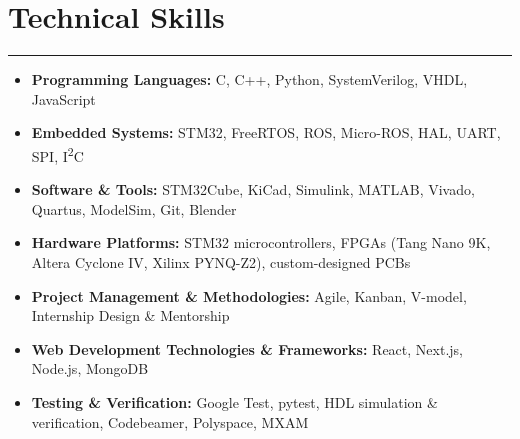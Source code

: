 \section*{Technical Skills}
\vspace{-5pt}
\noindent\rule{\textwidth}{0.4pt}

\begin{itemize}[leftmargin=*,noitemsep,topsep=3pt]
    \item \textbf{Programming Languages:} C, C++, Python, SystemVerilog, VHDL, JavaScript
    \item \textbf{Embedded Systems:} STM32, FreeRTOS, ROS, Micro-ROS, HAL, UART, SPI, I\textsuperscript{2}C
    \item \textbf{Software \& Tools:} STM32Cube, KiCad, Simulink, MATLAB, Vivado, Quartus, ModelSim, Git, Blender
    \item \textbf{Hardware Platforms:} STM32 microcontrollers, FPGAs (Tang Nano 9K, Altera Cyclone IV, Xilinx PYNQ-Z2), custom-designed PCBs
    \item \textbf{Project Management \& Methodologies:} Agile, Kanban, V-model, Internship Design \& Mentorship
    \item \textbf{Web Development Technologies \& Frameworks:} React, Next.js, Node.js, MongoDB
    \item \textbf{Testing \& Verification:} Google Test, pytest, HDL simulation \& verification, Codebeamer, Polyspace, MXAM
\end{itemize}
\vspace{20pt}
